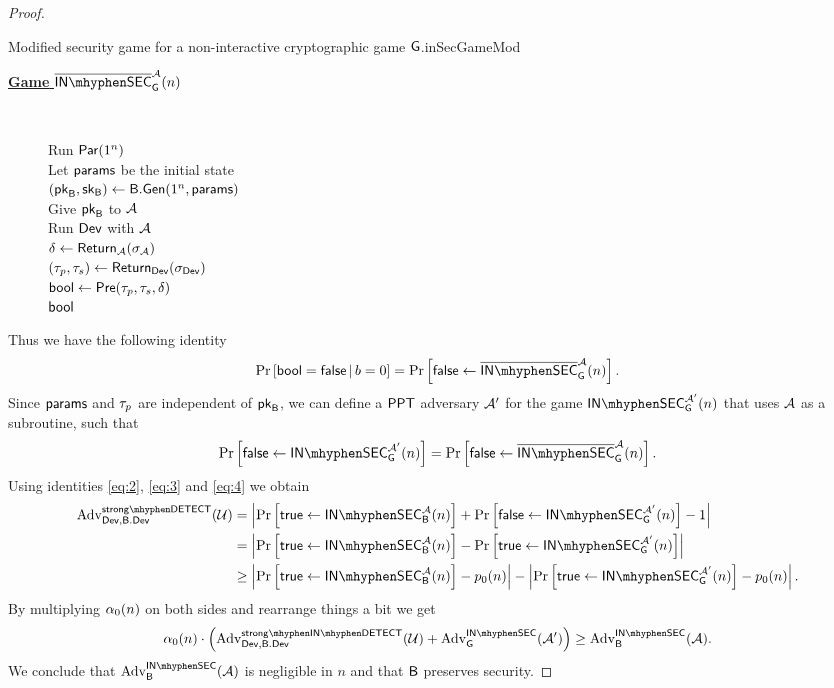 \begin{proof}
\begin{boxfigGame}{Modified security game for a non-interactive cryptographic game $\operatorname{\mathsf{G}}$.}{inSecGameMod}
  \begin{description}
	\item[\underline{\textbf{Game} $\pneg{\insecgame}_{\cgame}^{\adve}(n)$}] ~
 	
 		Run $\operatorname{\mathsf{Par}}(1^n)$ \\
 		Let $\mathsf{params}$ be the initial state \\
 		$(\mathsf{pk}_{\mathsf{B}},\mathsf{sk}_{\mathsf{B}})\leftarrow\mathsf{B}.\mathsf{Gen}(1^n,\mathsf{params})$ \\
 		Give $\mathsf{pk}_{\mathsf{B}}$ to $\mathcal{A}$ \\
		Run $\operatorname{\mathsf{Dev}}$ with $\mathcal{A}$ \\
 		$\delta\leftarrow\operatorname{\mathsf{Return}}_{\mathcal{A}}(\sigma_{\mathcal{A}})$ \\
 		$(\tau_p,\tau_s)\leftarrow \operatorname{\mathsf{Return}}_{\operatorname{\mathsf{Dev}}}(\sigma_{\operatorname{\mathsf{Dev}}})$ \\
 		$\mathsf{bool} \leftarrow \operatorname{\mathsf{Pre}}(\tau_p,\tau_s,\delta)$ \\
 		\Ret $\mathsf{bool}$		
  \end{description}
\end{boxfigGame}

Thus we have the following identity
\begin{align*}
	\condprob{\bool = \false}{b = 0} = \prob{\false \leftarrow \pneg{\insecgame}_{\cgame}^{\adve}(n)}.
\end{align*}
Since $\mathsf{params}$ and $\tau_p$ are independent of $\mathsf{pk}_{\mathsf{B}}$, we can define a $\mathsf{PPT}$ adversary $\mathcal{A}'$ for the game $\insecgame_{\cgame}^{\adve'}(n)$ that uses $\mathcal{A}$ as a subroutine, such that
\begin{align}
\label{eq:4}
	\prob{\false\leftarrow \insecgame_{\cgame}^{\adve'}(n)} = \prob{\false \leftarrow \pneg{\insecgame}_{\cgame}^{\adve}(n)}.
\end{align}
Using identities \ref{eq:2}, \ref{eq:3} and \ref{eq:4} we obtain
\begin{align*}
	\adv_{\dev,\bbdev}^{\strongdetectplain}(\user) & = \left\vert \prob{\true\leftarrow \insecgame_{\bb}^{\adve}(n)} + \prob{\false \leftarrow \insecgame_{\cgame}^{\adve'}(n)} - 1\right\vert \\
	& = \left\vert \prob{\true\leftarrow \insecgame_{\bb}^{\adve}(n)} - \prob{\true \leftarrow \insecgame_{\cgame}^{\adve'}(n)}\right\vert \\
	& \geq \left\vert \prob{ \true\leftarrow \insecgame_{\bb}^{\adve}(n)} - \basep(n)\right\vert  - \left\vert \prob{\true \leftarrow \insecgame_{\cgame}^{\adve'}(n)} - \basep(n) \right\vert.
\end{align*}
By multiplying $\alpha_{0}(n)$ on both sides and rearrange things a bit we get
\begin{align*}
\secf(n)\cdot \left(\adv_{\dev,\bbdev}^{\instrongdetectplain}(\user) + \adv_{\cgame}^{\insecgame}(\adve')\right) \geq \adv_{\bb}^{\insecgame}(\adve).
\end{align*}
We conclude that $\adv_{\bb}^{\insecgame}(\adve)$ is negligible in $n$ and that $\mathsf{B}$ preserves security.
\end{proof}


